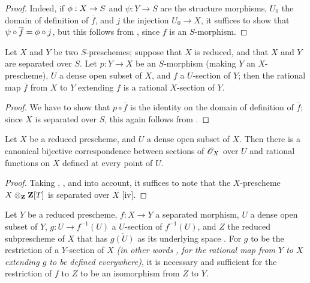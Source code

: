 \begin{proof}
\label{proof-1.7.2.4}
Indeed, if $\vphi:X\to S$ and $\psi:Y\to S$ are the structure morphisms, $U_0$ the domain of definition of $\overline{f}$, and $j$ the injection $U_0\to X$, it suffices to show that $\psi\circ\overline{f}=\phi\circ j$, but this follows from , since $f$ is an $S$-morphism.
\end{proof}

\begin{cor}[7.2.5]
\label{1.7.2.5}
Let $X$ and $Y$ be two $S$-preschemes; suppose that $X$ is reduced, and that $X$ and $Y$ are separated over $S$.
Let $p:Y\to X$ be an $S$-morphism (making $Y$ an $X$-prescheme), $U$ a dense open subset of $X$, and $f$ a $U$-section of $Y$; then the rational map $\overline{f}$ from $X$ to $Y$ extending $f$ is a rational $X$-section of $Y$.
\end{cor}

\begin{proof}
\label{proof-1.7.2.5}
We
have to show that $p\circ\overline{f}$ is the identity on the domain of definition of $\overline{f}$; since $X$ is separated over $S$, this again follows from .
\end{proof}

\begin{cor}[7.2.6]
\label{1.7.2.6}
Let $X$ be a reduced prescheme, and $U$ a dense open subset of $X$.
Then there is a canonical bijective correspondence between sections of $\mathscr{O}_X$ over $U$ and rational functions on $X$ defined at every point of $U$.
\end{cor}

\begin{proof}
\label{proof-1.7.2.6}
Taking , , and  into account, it suffices to note that the $X$-prescheme $X\otimes_{\mathbf{Z}}\mathbf{Z}[T]$ is separated over $X$ [iv].
\end{proof}

\begin{cor}[7.2.7]
\label{1.7.2.7}
Let $Y$ be a reduced prescheme, $f:X\to Y$ a separated morphism, $U$ a dense open subset of $Y$, $g:U\to f^{-1}(U)$ a $U$-section of $f^{-1}(U)$, and $Z$ the reduced subprescheme of $X$ that has $\overline{g(U)}$ as its underlying space .
For $g$ to be the restriction of a $Y$-section of $X$ \emph{(in other words , for the rational map from $Y$ to $X$ extending $g$ to be defined everywhere)}, it is necessary and sufficient for the restriction of $f$ to $Z$ to be an isomorphism from $Z$ to $Y$.
\end{cor}

